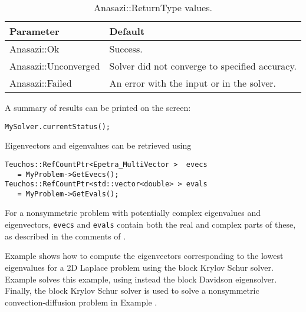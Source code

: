\begin{table}
\begin{center}
\begin{tabular}{| p{4cm} l |}
\hline
Parameter & Default \\
\hline
Anasazi::Ok          & Success. \\
Anasazi::Unconverged & Solver did not converge to specified accuracy. \\
Anasazi::Failed      & An error with the input or in the solver. \\
\hline
\end{tabular}
\caption{Anasazi::ReturnType values.}
\label{tab:anasazi:rt}
\end{center}
\end{table}

A summary of results can be printed on the screen:
\begin{verbatim}
MySolver.currentStatus();
\end{verbatim}
Eigenvectors and eigenvalues can be retrieved using
\begin{verbatim}
Teuchos::RefCountPtr<Epetra_MultiVector >  evecs 
   = MyProblem->GetEvecs();
Teuchos::RefCountPtr<std::vector<double> > evals 
   = MyProblem->GetEvals();
\end{verbatim}
For a nonsymmetric problem with potentially complex eigenvalues and
eigenvectors, \verb!evecs! and \verb!evals! contain both the real and
complex parts of these, as described in the comments of
.

Example  shows how to compute the eigenvectors
corresponding to the lowest eigenvalues for a 2D Laplace problem using
the block Krylov Schur solver.  Example 
solves this example, using instead the block Davidson eigensolver.
Finally, the block Krylov Schur solver is used to solve a nonsymmetric
convection-diffusion problem in Example .



